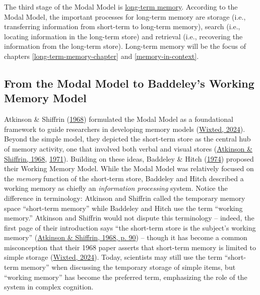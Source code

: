 \documentclass[
]{krantz}
\begin{document}
The third stage of the Modal Model is \protect\hyperlink{long-term-memory}{long-term memory}. According to the Modal Model, the important processes for long-term memory are storage (i.e., transferring information from short-term to long-term memory), search (i.e., locating information in the long-term store) and retrieval (i.e., recovering the information from the long-term store). Long-term memory will be the focus of chapters \ref{long-term-memory-chapter} and \ref{memory-in-context}.

\hypertarget{from-the-modal-model-to-baddeleys-working-memory-model}{%
\subsection*{From the Modal Model to Baddeley's Working Memory Model}\label{from-the-modal-model-to-baddeleys-working-memory-model}}


Atkinson \& Shiffrin (\protect\hyperlink{ref-atkinson1968human}{1968}) formulated the Modal Model as a foundational framework to guide researchers in developing memory models (\protect\hyperlink{ref-wixted2024atkinson}{Wixted, 2024}). Beyond the simple model, they depicted the short-term store as the central hub of memory activity, one that involved both verbal and visual stores (\protect\hyperlink{ref-atkinson1968human}{Atkinson \& Shiffrin, 1968}, \protect\hyperlink{ref-atkinson1971control}{1971}). Building on these ideas, Baddeley \& Hitch (\protect\hyperlink{ref-BADDELEY197447}{1974}) proposed their Working Memory Model. While the Modal Model was relatively focused on the \emph{memory} function of the short-term store, Baddeley and Hitch described a working memory as chiefly an \emph{information processing} system. Notice the difference in terminology: Atkinson and Shiffrin called the temporary memory space ``short-term memory'' while Baddeley and Hitch use the term ``working memory.'' Atkinson and Shiffrin would not dispute this terminology -- indeed, the first page of their introduction says ``the short-term store is the subject's working memory'' (\protect\hyperlink{ref-atkinson1968human}{Atkinson \& Shiffrin, 1968, p. 90}) -- though it has become a common misconception that their 1968 paper asserts that short-term memory is limited to simple storage (\protect\hyperlink{ref-wixted2024atkinson}{Wixted, 2024}). Today, scientists may still use the term ``short-term memory'' when discussing the temporary storage of simple items, but ``working memory'' has become the preferred term, emphasizing the role of the system in complex cognition.
\end{document}
